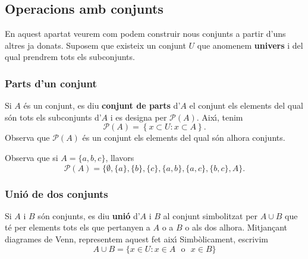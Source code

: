 \subsection{Operacions amb conjunts}

En aquest apartat veurem com podem construir nous conjunts a partir d'uns
altres ja donats. Suposem que existeix un conjunt $U$ que anomenem \textbf{%
univers} i del qual prendrem tots els subconjunts.

\subsubsection{Parts d'un conjunt}

Si $A$ \'{e}s un conjunt, es diu \textbf{conjunt de parts} d'$A$ el conjunt
els elements del qual s\'{o}n tots els subconjunts d'$A$ i es designa per $%
\mathcal{P}(A)$. Aix\'{\i}, tenim%
\begin{equation*}
\mathcal{P}(A)=\left\{ x\subset U:x\subset A\right\} \text{.}
\end{equation*}
Observa que $\mathcal{P}(A)$ \'{e}s un conjunt els elements del qual s\'{o}n
alhora conjunts.

\bigskip

\begin{exem}
Observa que si $A=\{a,b,c\}$, llavors%
\begin{equation*}
\mathcal{P}(A)=\{\emptyset ,\{a\},\{b\},\{c\},\{a,b\},\{a,c\},\{b,c\},A\}%
\text{.}
\end{equation*}
\end{exem}

\subsubsection{Uni\'{o} de dos conjunts}

Si $A$ i $B$ s\'{o}n conjunts, es diu \textbf{uni\'{o}} d'$A$ i $B$ al
conjunt simbolitzat per $A\cup B$ que t\'{e} per elements tots els que
pertanyen a $A$ o a $B$ o als dos alhora. Mitjan\c{c}ant diagrames de Venn,
representem aquest fet aix\'{\i} 
Simb\`{o}licament, escrivim%
\begin{equation*}
A\cup B=\{x\in U:x\in A\text{ ~o~ }x\in B\}
\end{equation*}


